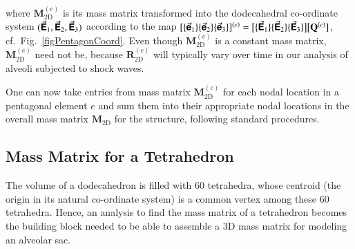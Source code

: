 where $\mathbf{M}^{(e)}_{\mathrm{2D}}$ is its mass matrix transformed into the dodecahedral co-ordinate system $( \vec{\boldsymbol{\mathsf{E}}}_1 , \vec{\boldsymbol{\mathsf{E}}}_2 , \vec{\boldsymbol{\mathsf{E}}}_3 )$ according to the map $[ \{ \vec{\boldsymbol{\mathsf{e}}}_1 \} \{ \vec{\boldsymbol{\mathsf{e}}}_2 \} \{ \vec{\boldsymbol{\mathsf{e}}}_3 \} ]^{(e)} = \bigl[ \{ \vec{\boldsymbol{\mathsf{E}}}_1 \} \{ \vec{\boldsymbol{\mathsf{E}}}_2 \} \{ \vec{\boldsymbol{\mathsf{E}}}_3 \} \bigr] \bigl[ \mathbf{Q}^{(e)} ]$, cf.\ Fig.~\ref{figPentagonCoord}.  Even though $\boldsymbol{M}^{(e)}_{\mathrm{2D}}$ is a constant mass matrix, $\mathbf{M}^{(e)}_{\mathrm{2D}}$ need not be, because $\mathbf{R}^{(e)}_{\mathrm{2D}}$ will typically vary over time in our analysis of alveoli subjected to shock waves.

One can now take entries from mass matrix $\mathbf{M}^{(e)}_{\mathrm{2D}}$ for each nodal location in a pentagonal element $e$ and sum them into their appropriate nodal locations in the overall mass matrix $\mathbf{M}_{\mathrm{2D}}$ for the structure, following standard procedures. \cite{ClaytonChung18}

\subsection{Mass Matrix for a Tetrahedron}

The volume of a dodecahedron is filled with 60 tetrahedra, whose centroid (the origin in its natural co-ordinate system) is a common vertex among these 60 tetrahedra. Hence, an analysis to find the mass matrix of a tetrahedron becomes the building block needed to be able to assemble a 3D mass matrix for modeling an alveolar sac.

